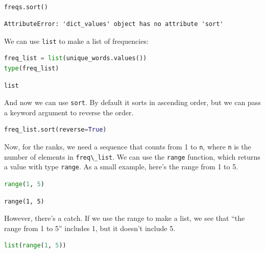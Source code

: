 \begin{lstlisting}[language=Python,style=source]
%%expect AttributeError

freqs.sort()
\end{lstlisting}

\begin{lstlisting}[style=output]
AttributeError: 'dict_values' object has no attribute 'sort'
\end{lstlisting}

We can use \passthrough{\lstinline!list!} to make a list of frequencies:

\begin{lstlisting}[language=Python,style=source]
freq_list = list(unique_words.values())
type(freq_list)
\end{lstlisting}

\begin{lstlisting}[style=output]
list
\end{lstlisting}

And now we can use \passthrough{\lstinline!sort!}. By default it sorts
in ascending order, but we can pass a keyword argument to reverse the
order.

\begin{lstlisting}[language=Python,style=source]
freq_list.sort(reverse=True)
\end{lstlisting}

Now, for the ranks, we need a sequence that counts from 1 to
\passthrough{\lstinline!n!}, where \passthrough{\lstinline!n!} is the
number of elements in \passthrough{\lstinline!freq\_list!}. We can use
the \passthrough{\lstinline!range!} function, which returns a value with
type \passthrough{\lstinline!range!}. As a small example, here's the
range from 1 to 5.

\begin{lstlisting}[language=Python,style=source]
range(1, 5)
\end{lstlisting}

\begin{lstlisting}[style=output]
range(1, 5)
\end{lstlisting}

However, there's a catch. If we use the range to make a list, we see
that ``the range from 1 to 5'' includes 1, but it doesn't include 5.

\begin{lstlisting}[language=Python,style=source]
list(range(1, 5))
\end{lstlisting}

